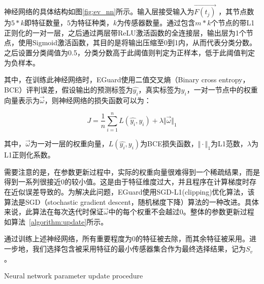 神经网络的具体结构如图\ref{fig:ev_nn}所示。输入层接受输入为$\vec{F(t_j)}$ ，其节点数为$5*k$即特征数量，$5$为特征种类，$k$为传感器数量。通过包含$m*k$个节点的带L1正则化的一对一层，之后通过两层带ReLU激活函数的全连接层，输出层为1个节点，使用Sigmoid激活函数，其目的是将输出压缩至0到1内，从而代表分类分数。之后设置分类阈值为0.5，分类分数高于此阈值则判定为正样本，低于此阈值判定为负样本。

其中，在训练此神经网络时，EGuard使用二值交叉熵（Binary cross entropy，BCE）评判误差，假设输出的预测标签为$\hat{y_i}$，真实标签为$y_i$，一对一节点中的权重向量表示为$\vec{\omega}$，则神经网络的损失函数可以为：

\begin{equation}
	\label{eq:loss}
	J=\frac{1}{n} \sum_{i=1}^n L(\hat{y_i},y_i) + \lambda\Vert\vec{\omega}\Vert_1
\end{equation}

其中，$\vec{\omega}$为一对一层的权重向量，$L(\hat{y_i},y_i)$为BCE损失函数，$\Vert\cdot\Vert_1$为L1范数，$\lambda$为L1正则化系数。

需要注意的是，在参数更新过程中，实际的权重向量很难得到一个稀疏结果，而是得到一系列很接近0的较小值。这是由于特征维度过大，并且程序在计算梯度时存在近似误差导致的。为解决此问题，EGuard使用SGD-L1(clipping)优化算法，该算法是SGD（stochastic gradient descent，随机梯度下降）算法的一种改进。具体来说，此算法在每次迭代时保$证\vec{\omega}$中的每个权重不会越过0。整体的参数更新过程如算法~\ref{algorithm:update}所示。

通过训练上述神经网络，所有重要程度为0的特征被去除，而其余特征被采用。进一步地，我们选择包含被采用特征的最小传感器集合作为最终选择结果，记为$S_v$。

\begin{algorithm}[!h]
	\caption{Neural network parameter update procedure}
	\label{algorithm:update}
	\LinesNumbered
\end{algorithm}


